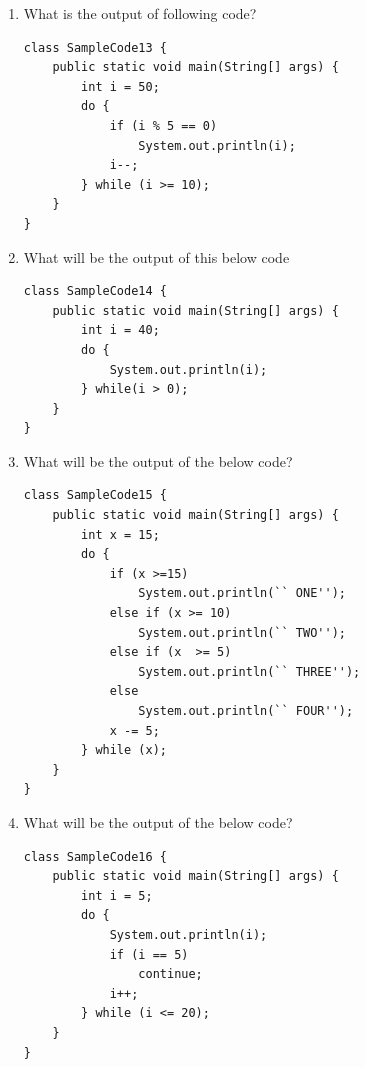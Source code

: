 \documentclass[11pt,a4paper]{article}
\def\AnswerBox{\fbox{\begin{minipage}{4in}\hfill\vspace{0.5in}\end{minipage}}}
\begin{document}
\begin{enumerate}
\item What is the output of following code?
\begin{lstlisting}
class SampleCode13 {
    public static void main(String[] args) {
        int i = 50;
        do {
            if (i % 5 == 0) 
                System.out.println(i);
            i--;
        } while (i >= 10);
    }
}
\end{lstlisting}
\AnswerBox

\item What will be the output of this below code
\begin{lstlisting}
class SampleCode14 {
    public static void main(String[] args) {
        int i = 40;
    	do {
            System.out.println(i);
        } while(i > 0);
    }
}
\end{lstlisting}

\AnswerBox

\item What will be the output of the below code?

\begin{lstlisting}
class SampleCode15 {
    public static void main(String[] args) {
        int x = 15;
        do {
            if (x >=15)
                System.out.println(`` ONE'');
            else if (x >= 10)
                System.out.println(`` TWO'');
            else if (x  >= 5)
                System.out.println(`` THREE'');
            else 
                System.out.println(`` FOUR'');
            x -= 5;
        } while (x);
    }
}
\end{lstlisting}

\item What will be the output of the below code?

\begin{lstlisting}
class SampleCode16 {
    public static void main(String[] args) {
        int i = 5;
        do {
            System.out.println(i);
            if (i == 5)
                continue;
            i++;
        } while (i <= 20);
    }
}
\end{lstlisting}

\AnswerBox
\end{enumerate}
\end{document}

